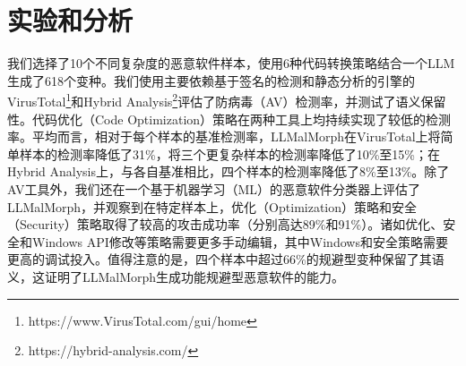 \section{实验和分析}
我们选择了10个不同复杂度的恶意软件样本，使用6种代码转换策略结合一个LLM生成了618个变种。我们使用主要依赖基于签名的检测和静态分析的引擎的VirusTotal\footnote{https://www.VirusTotal.com/gui/home}和Hybrid Analysis\footnote{https://hybrid-analysis.com/}评估了防病毒（AV）检测率，并测试了语义保留性。代码优化（Code Optimization）策略在两种工具上均持续实现了较低的检测率。平均而言，相对于每个样本的基准检测率，LLMalMorph在VirusTotal上将简单样本的检测率降低了31\%，将三个更复杂样本的检测率降低了10\%至15\%；在Hybrid Analysis上，与各自基准相比，四个样本的检测率降低了8\%至13\%。除了AV工具外，我们还在一个基于机器学习（ML）的恶意软件分类器上评估了LLMalMorph，并观察到在特定样本上，优化（Optimization）策略和安全（Security）策略取得了较高的攻击成功率（分别高达89\%和91\%）。诸如优化、安全和Windows API修改等策略需要更多手动编辑，其中Windows和安全策略需要更高的调试投入。值得注意的是，四个样本中超过66\%的规避型变种保留了其语义，这证明了LLMalMorph生成功能规避型恶意软件的能力。